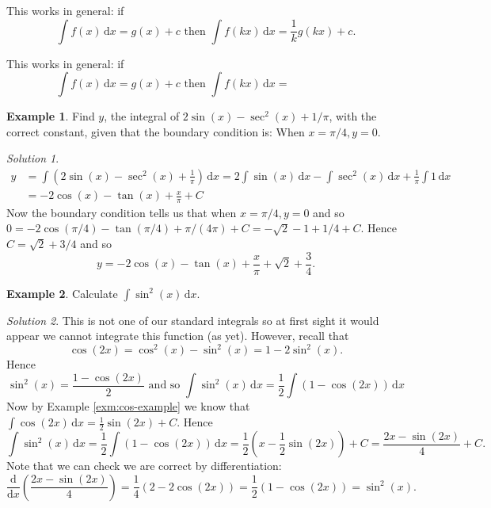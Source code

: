 \documentclass[
  english,
  11pt,
  oneside]{book}
\newcommand{\slide}{}
\theoremstyle{definition}
\theoremstyle{definition}
\newtheorem{example}{Example}[chapter]
\theoremstyle{definition}
\theoremstyle{definition}
\theoremstyle{remark}
\newtheorem*{solution}{Solution}
\begin{document}
\begin{notslides}

This works in general: if
\[
\int f(x)\,\mathrm{d}x = g(x) + c\text{ then }\int f(kx)\,\mathrm{d}x = \frac1kg(kx) + c.
\]

\end{notslides}

\begin{slidesonly}

This works in general: if
\[
\int f(x)\,\mathrm{d}x = g(x) + c\text{ then }\int f(kx)\,\mathrm{d}x = \phantom{\frac1kg(kx) + c.}
\]
\slide

\end{slidesonly}

\begin{example}
Find \(y\), the integral of \(2\sin(x) - \sec^2(x)+1/\pi\), with the correct constant, given that the boundary condition is:
When \(x = \pi/4, y = 0\).
\end{example}

\begin{solution}
\begin{align*}
y& = \int(2\sin(x) - \sec^2(x)+\frac1{\pi})\,\mathrm{d}x = 2\int \sin(x)\,\mathrm{d}x - \int \sec^2(x)\,\mathrm{d}x + \frac{1}{\pi}\int 1\,\mathrm{d}x\\
&= -2\cos(x)-\tan(x)+\frac{x}{\pi}+C
\end{align*}
Now the boundary condition tells us that when \(x=\pi/4, y = 0\) and so \(0=-2\cos(\pi/4)-\tan(\pi/4)+\pi/(4\pi)+C = -\sqrt{2}-1+1/4+C\). Hence \(C=\sqrt{2}+3/4\) and so
\[
y = -2\cos(x)-\tan(x)+\frac{x}{\pi}+\sqrt{2}+\frac34.
\]
\end{solution}

\slide

\begin{example}
Calculate \(\displaystyle\int\sin^2(x)\,\mathrm{d}x\).
\end{example}

\begin{solution}
This is not one of our standard integrals so at first sight it would appear we cannot integrate this function (as yet). However, recall that
\[
\cos(2x) = \cos^2(x)-\sin^2(x) = 1-2\sin^2(x).
\]
Hence
\[
\sin^2(x) = \frac{1-\cos(2x)}{2}\text{ and so }\int\sin^2(x)\,\mathrm{d}x = \frac12\int(1-\cos(2x))\,\mathrm{d}x
\]
Now by Example \ref{exm:cos-example} we know that \(\displaystyle\int\cos(2x)\,\mathrm{d}x = \frac12\sin(2x)+C\).
Hence
\[
\int\sin^2(x)\,\mathrm{d}x = \frac12\int(1-\cos(2x))\,\mathrm{d}x = \frac12\left(x-\frac12\sin(2x)\right)+C = \frac{2x-\sin(2x)}{4}+C.
\]
Note that we can check we are correct by differentiation:
\[
\frac{\mathrm{d}}{\mathrm{d}x}\left(\frac{2x-\sin(2x)}{4}\right)=\frac14\left(2-2\cos(2x)\right)=\frac12\left(1-\cos(2x)\right)=\sin^2(x).
\]
\end{solution}
\end{document}
